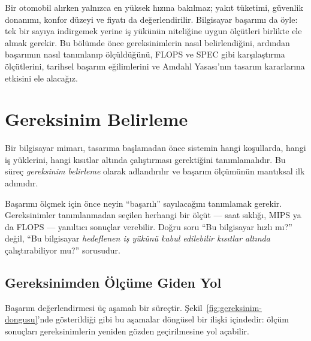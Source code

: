 Bir otomobil alırken yalnızca en yüksek hızına bakılmaz; yakıt tüketimi, güvenlik donanımı, konfor düzeyi ve fiyatı da değerlendirilir. Bilgisayar başarımı da öyle: tek bir sayıya indirgemek yerine iş yükünün niteliğine uygun ölçütleri birlikte ele almak gerekir. Bu bölümde önce gereksinimlerin nasıl belirlendiğini, ardından başarımın nasıl tanımlanıp ölçüldüğünü, FLOPS ve SPEC gibi karşılaştırma ölçütlerini, tarihsel başarım eğilimlerini ve Amdahl Yasası'nın tasarım kararlarına etkisini ele alacağız.


\section{Gereksinim Belirleme}
\label{sec:gereksinim-belirleme}

Bir bilgisayar mimarı, tasarıma başlamadan önce sistemin hangi koşullarda, hangi iş yüklerini, hangi kısıtlar altında çalıştırması gerektiğini tanımlamalıdır. Bu süreç \emph{gereksinim belirleme} olarak adlandırılır ve başarım ölçümünün mantıksal ilk adımıdır.

\begin{tanim}
Başarımı ölçmek için önce neyin ``başarılı'' sayılacağını tanımlamak gerekir. Gereksinimler tanımlanmadan seçilen herhangi bir ölçüt --- saat sıklığı, MIPS ya da FLOPS --- yanıltıcı sonuçlar verebilir. Doğru soru ``Bu bilgisayar hızlı mı?'' değil, ``Bu bilgisayar \emph{hedeflenen iş yükünü kabul edilebilir kısıtlar altında} çalıştırabiliyor mu?'' sorusudur.
\end{tanim}


\subsection{Gereksinimden Ölçüme Giden Yol}
\label{subsec:gereksinimden-olcume}

Başarım değerlendirmesi üç aşamalı bir süreçtir. Şekil~\ref{fig:gereksinim-dongusu}'nde gösterildiği gibi bu aşamalar döngüsel bir ilişki içindedir: ölçüm sonuçları gereksinimlerin yeniden gözden geçirilmesine yol açabilir.

